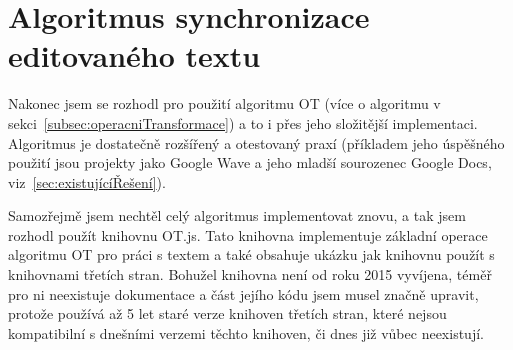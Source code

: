 
\section{Algoritmus synchronizace editovaného textu}\label{sec:synchronizaceEditovanéhoTextu}

Nakonec jsem se rozhodl pro použití algoritmu \gls{OT} (více o algoritmu v sekci~\ref{subsec:operacniTransformace}) a to i přes jeho složitější implementaci.
Algoritmus je dostatečně rozšířený a otestovaný praxí (příkladem jeho úspěšného použití jsou projekty jako Google Wave a jeho mladší sourozenec Google Docs, viz~\ref{sec:existujícíŘešení}).

Samozřejmě jsem nechtěl celý algoritmus implementovat znovu, a tak jsem rozhodl použít knihovnu OT.js.
Tato knihovna implementuje základní operace algoritmu \gls{OT} pro práci s textem a také obsahuje ukázku jak knihovnu použít s knihovnami třetích stran.
Bohužel knihovna není od roku 2015 vyvíjena, téměř pro ni neexistuje dokumentace a část jejího kódu jsem musel značně upravit, protože používá až 5 let staré verze knihoven třetích stran, které nejsou kompatibilní s dnešními verzemi těchto knihoven, či dnes již vůbec neexistují.
